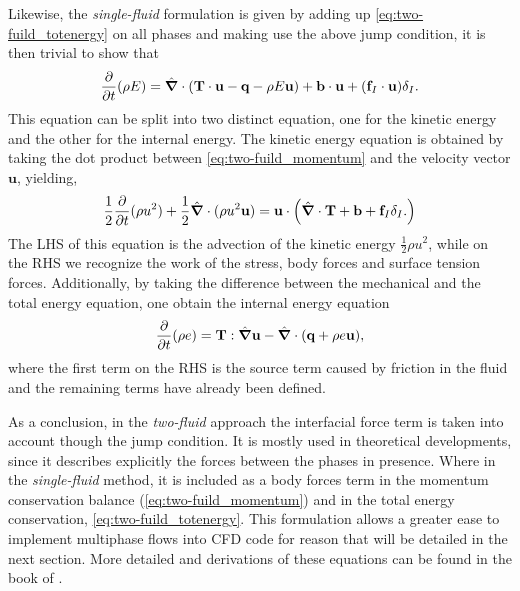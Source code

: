 Likewise, the \textit{single-fluid} formulation is given by adding up \ref{eq:two-fuild_totenergy}
on all phases and making use the above jump condition, it is then trivial to show that
\begin{equation}
    \frac{\partial}{\partial t} (\rho E)
    = \hat{\bm{\nabla}} \cdot \left(
        \textbf{T}\cdot\textbf{u}
        - \textbf{q}
        -\rho E \textbf{u} 
    \right)
    + \textbf{b}\cdot\textbf{u}
    +(\textbf{f}_I\cdot\textbf{u})\delta_I.
    \label{eq:one-fuild_totenergy}
\end{equation}
This equation can be split into two distinct equation, one for the kinetic energy and the other for the internal energy. 
The kinetic energy equation is obtained by taking the dot product between 
\ref{eq:two-fuild_momentum} and the velocity vector $\textbf{u}$, yielding,
\begin{equation}
    \frac{1}{2}\frac{\partial}{\partial t} (\rho u^2)
    +\frac{1}{2} \hat{\bm{\nabla}} \cdot (\rho u^2 \textbf{u})
    =\textbf{u}\cdot\left(
        \hat{\bm{\nabla}}\cdot\textbf{T}
        +\textbf{b}
        +\textbf{f}_I\delta_I.
    \right)
    \label{eq:one-fuild_meca}
\end{equation}
The LHS of this equation is the advection of the kinetic energy $\frac{1}{2}\rho u^2$, while on the RHS we recognize the work of the stress, body forces and surface tension forces. 
Additionally, by taking the difference between the mechanical and the total energy equation, one 
obtain the internal energy equation \citep{tryggvason2011direct}
\begin{equation}
    \frac{\partial}{\partial t} (\rho e)
    = 
    \textbf{T}:\hat{\bm{\nabla}}\textbf{u}
    - \hat{\bm{\nabla}}\cdot(\textbf{q} + \rho  e\textbf{u}),
    \label{eq:one-fuild_internal_energy}
\end{equation}
where the first term on the RHS is the source term caused by friction in the fluid and the remaining terms have already been defined. 

As a conclusion, in the \textit{two-fluid} approach the interfacial force term is taken into account though the jump condition. 
It is mostly used in theoretical developments, since it describes explicitly the forces between the phases in presence. 
Where in the \textit{single-fluid} method, it is included as a body forces term in the momentum conservation balance (\ref{eq:two-fuild_momentum}) and in the total energy conservation, \ref{eq:two-fuild_totenergy}. 
This formulation allows a greater ease to implement multiphase flows into CFD code for reason that will be detailed in the next section.
More detailed and derivations of these equations can be found in the book of \citet{morel2015mathematical}. 
